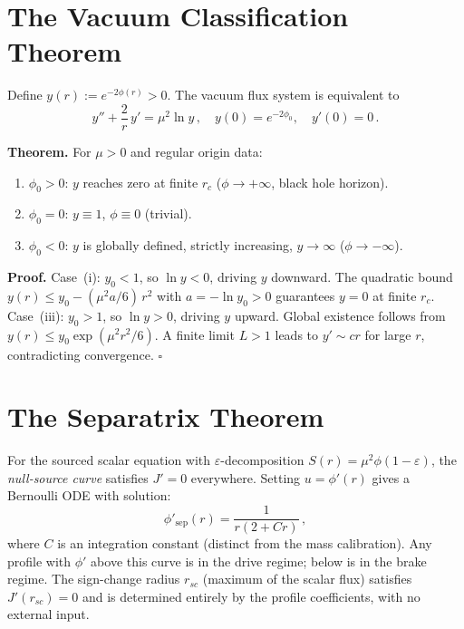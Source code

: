 \documentclass[aps,prd,twocolumn,superscriptaddress,nofootinbib,longbibliography]{revtex4-2}
\newcommand{\phiz}{\phi_0}
\begin{document}
\section{The Vacuum Classification Theorem}\label{app:vacuum}

Define $y(r) := e^{-2\phi(r)} > 0$.  The vacuum flux system is
equivalent to
\begin{equation}\label{eq:yode}
  y'' + \frac{2}{r}\,y' = \mu^2\ln y\,,\quad
  y(0) = e^{-2\phiz},\quad y'(0) = 0\,.
\end{equation}

\textbf{Theorem.} For $\mu > 0$ and regular origin data:
\begin{enumerate}
\item[(i)] $\phiz > 0$: $y$ reaches zero at finite $r_c$
  ($\phi \to +\infty$, black hole horizon).
\item[(ii)] $\phiz = 0$: $y \equiv 1$, $\phi \equiv 0$ (trivial).
\item[(iii)] $\phiz < 0$: $y$ is globally defined, strictly
  increasing, $y \to \infty$ ($\phi \to -\infty$).
\end{enumerate}

\textbf{Proof.}  Case~(i): $y_0 < 1$, so $\ln y < 0$, driving $y$
downward.  The quadratic bound
$y(r) \leq y_0 - (\mu^2 a/6)\,r^2$ with $a = -\ln y_0 > 0$
guarantees $y = 0$ at finite $r_c$.  Case~(iii): $y_0 > 1$, so
$\ln y > 0$, driving $y$ upward.  Global existence follows from
$y(r) \leq y_0\exp(\mu^2 r^2/6)$.  A finite limit $L > 1$ leads to
$y' \sim cr$ for large $r$, contradicting convergence.  $\square$

\section{The Separatrix Theorem}\label{app:separatrix}

For the sourced scalar equation with $\varepsilon$-decomposition
$S(r) = \mu^2\phi(1 - \varepsilon)$, the \emph{null-source curve}
satisfies $J' = 0$ everywhere.  Setting $u = \phi'(r)$ gives a
Bernoulli ODE with solution:
\begin{equation}\label{eq:separatrix}
  \phi'_{\mathrm{sep}}(r) = \frac{1}{r(2 + Cr)}\,,
\end{equation}
where $C$ is an integration constant (distinct from the mass
calibration).  Any profile with $\phi'$ above this curve is in the
drive regime; below is in the brake regime.  The sign-change radius
$r_{sc}$ (maximum of the scalar flux) satisfies
$J'(r_{sc}) = 0$ and is determined entirely by the profile
coefficients, with no external input.
\end{document}
